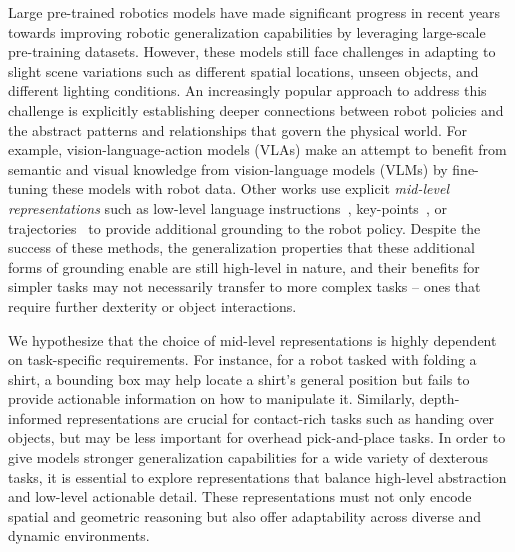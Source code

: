 \documentclass[conference,dvipsnames]{IEEEtran}
\begin{document}

Large pre-trained robotics models have made significant progress in recent years towards improving robotic generalization capabilities by leveraging large-scale pre-training datasets. However, these models still face challenges in adapting to slight scene variations such as different spatial locations, unseen objects, and different lighting conditions. An increasingly popular approach to address this challenge is explicitly establishing deeper connections between robot policies and the abstract patterns and relationships that govern the physical world.  For example, vision-language-action models (VLAs) make an attempt to benefit from semantic and visual knowledge from vision-language models (VLMs) by fine-tuning these models with robot data. Other works use explicit \emph{mid-level representations} such as low-level language instructions~\cite{belkhale2024rthactionhierarchiesusing}, key-points~\cite{sundaresan2023kitekeypointconditionedpoliciessemantic, liu2024mokaopenworldroboticmanipulation}, or trajectories~\cite{niu2024llarvavisionactioninstructiontuning, gu2023rttrajectoryrobotictaskgeneralization, zawalski2024roboticcontrolembodiedchainofthought} to provide additional grounding to the robot policy. Despite the success of these methods, the generalization properties that these additional forms of grounding enable are still high-level in nature, and their benefits for simpler tasks may not necessarily transfer to more complex tasks -- ones that require further dexterity or object interactions. 

We hypothesize that the choice of mid-level representations is highly dependent on task-specific requirements. For instance, for a robot tasked with folding a shirt, a bounding box may help locate a shirt's general position but fails to provide actionable information on how to manipulate it. Similarly, depth-informed representations are crucial for contact-rich tasks such as handing over objects, but may be less important for overhead pick-and-place tasks. In order to give models stronger generalization capabilities for a wide variety of dexterous tasks, it is essential to explore representations that balance high-level abstraction and low-level actionable detail. These representations must not only encode spatial and geometric reasoning but also offer adaptability across diverse and dynamic environments.
\end{document}
